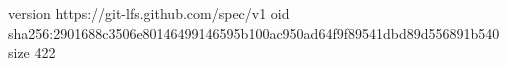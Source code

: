 version https://git-lfs.github.com/spec/v1
oid sha256:2901688c3506e80146499146595b100ac950ad64f9f89541dbd89d556891b540
size 422
